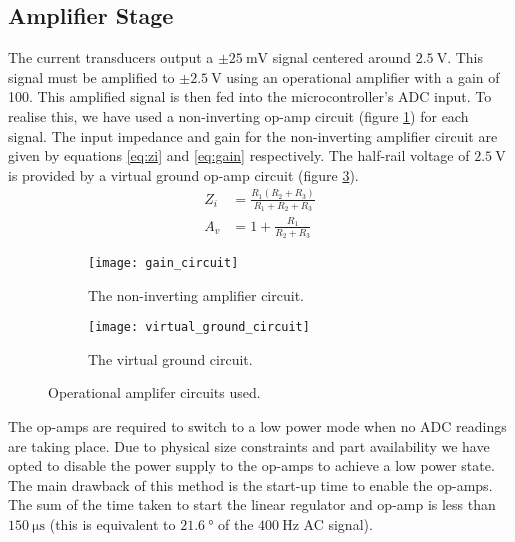 \subsection{Amplifier Stage}

The current transducers output a $\pm \SI{25}{\milli\volt}$ signal centered around $\SI{2.5}{\volt}$.
This signal must be amplified to $\pm \SI{2.5}{\volt}$ using an operational amplifier with a gain of 100.
This amplified signal is then fed into the microcontroller's ADC input.
To realise this, we have used a non-inverting op-amp circuit (figure \ref{fig:non-inverting-op-amp}) for each signal.
The input impedance and gain for the non-inverting amplifier circuit are given by equations \ref{eq:zi} and \ref{eq:gain} respectively.
The half-rail voltage of $\SI{2.5}{\volt}$ is provided by a virtual ground op-amp circuit (figure \ref{fig:half-supply}).
\begin{align}
	Z_i &= \frac{R_1 (R_2 + R_3)}{R_1 + R_2 + R_3} \label{eq:zi} \\
	A_v &= 1 + \frac{R_1}{R_2 + R_3}\label{eq:gain}
\end{align}

\begin{figure}[ht]
\centering

\begin{subfigure}[c]{0.45\textwidth}
	\centering
	\texttt{[image: gain\_circuit]}
	\caption{The non-inverting amplifier circuit.}
	\label{fig:non-inverting-op-amp}
\end{subfigure}
\hfill
\begin{subfigure}[c]{0.45\textwidth}
	\centering
	\vfill
	\texttt{[image: virtual\_ground\_circuit]}
	\vfill
	\caption{The virtual ground circuit.}
	\label{fig:half-supply}
\end{subfigure}

\caption{Operational amplifer circuits used.}
\end{figure}

The op-amps are required to switch to a low power mode when no ADC readings are taking place.
Due to physical size constraints and part availability we have opted to disable the power supply to the op-amps to achieve a low power state.
The main drawback of this method is the start-up time to enable the op-amps.
The sum of the time taken to start the linear regulator and op-amp is less than $\SI{150}{\micro\second}$ (this is equivalent to $\SI{21.6}{\degree}$ of the $\SI{400}{\hertz}$ AC signal).

